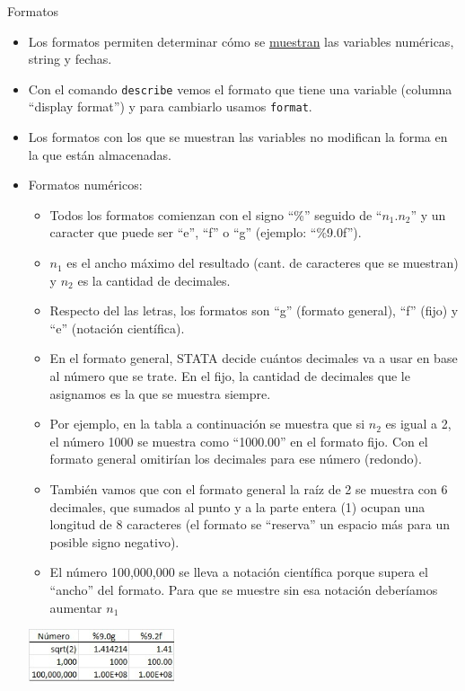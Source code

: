 \documentclass{beamer}
\begin{document}
\begin{frame}[allowframebreaks]{Formatos}
\begin{itemize}
\item Los formatos permiten determinar cómo se \underline{muestran} las variables numéricas, string y fechas.
\item Con el comando \texttt{describe} vemos el formato que tiene una variable (columna ``display format'') y para cambiarlo usamos \texttt{format}.
\item Los formatos con los que se muestran las variables no modifican la forma en la que están almacenadas.
\item Formatos numéricos:
\begin{itemize}
\item Todos los formatos comienzan con el signo ``\%'' seguido de ``$n_{1}.n_{2}$'' y un caracter que puede ser ``e'', ``f'' o ``g'' (ejemplo: ``\%9.0f''). 
\item $n_{1}$ es el ancho máximo del resultado (cant. de caracteres que se muestran) y $n_{2}$ es la cantidad de decimales.
\item Respecto del las letras, los formatos son ``g'' (formato general), ``f'' (fijo) y ``e'' (notación científica). 
\item En el formato general, STATA decide cuántos decimales va a usar en base al número que se trate. En el fijo, la cantidad de decimales que le asignamos es la que se muestra siempre. 
\item Por ejemplo, en la tabla a continuación se muestra que si $n_{2}$ es igual a 2, el número 1000 se muestra como ``1000.00'' en el formato fijo. Con el formato general omitirían los decimales para ese número (redondo).
\item También vamos que con el formato general la raíz de 2 se muestra con 6 decimales, que sumados al punto y a la parte entera (1) ocupan una longitud de 8 caracteres (el formato se ``reserva'' un espacio más para un posible signo negativo).
\item El número 100,000,000 se lleva a notación científica porque supera el ``ancho'' del formato. Para que se muestre sin esa notación deberíamos aumentar $n_{1}$\\\smallskip
\end{itemize}
\centerline{\includegraphics[height=1.6cm]{format.jpg}}

\end{itemize}
\end{frame}
\end{document}
